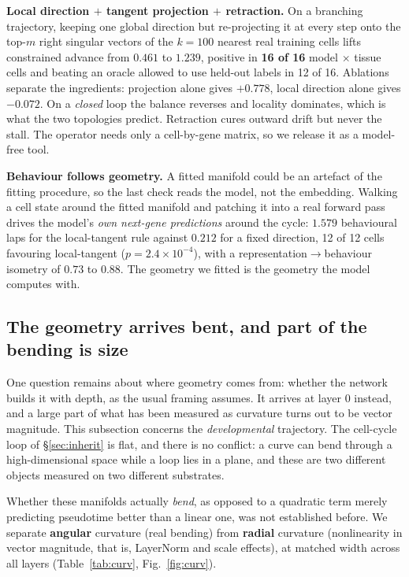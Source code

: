 \documentclass[11pt]{article}
\begin{document}
\textbf{Local direction $+$ tangent projection $+$ retraction.} On a branching trajectory, keeping one
global direction but re-projecting it at every step onto the top-$m$ right singular vectors of the
$k=100$ nearest real training cells lifts constrained advance from $0.461$ to $\mathbf{1.239}$,
positive in \textbf{16 of 16} model $\times$ tissue cells and beating an oracle allowed to use held-out
labels in 12 of 16. Ablations separate the ingredients: projection alone gives $+0.778$, local
direction alone gives $-0.072$. On a \emph{closed} loop the balance reverses and locality dominates,
which is what the two topologies predict. Retraction cures outward drift but never the stall. The
operator needs only a cell-by-gene matrix, so we release it as a model-free tool.

\textbf{Behaviour follows geometry.} A fitted manifold could be an artefact of the fitting procedure,
so the last check reads the model, not the embedding. Walking a cell state around the fitted
manifold and patching it into a real forward pass drives the model's \emph{own next-gene predictions}
around the cycle: $1.579$ behavioural laps for the local-tangent rule against $0.212$ for a fixed
direction, 12 of 12 cells favouring local-tangent ($p=2.4\times10^{-4}$), with a
representation$\to$behaviour isometry of $0.73$ to $0.88$. The geometry we fitted is the geometry the
model computes with.

\subsection{The geometry arrives bent, and part of the bending is size}\label{sec:curv}
One question remains about where geometry comes from: whether the network builds it with depth, as the
usual framing assumes. It arrives at layer 0 instead, and a large part of what has been measured as
curvature turns out to be vector magnitude. This subsection concerns the \emph{developmental}
trajectory. The cell-cycle loop of \S\ref{sec:inherit} is flat, and there is no conflict: a curve can
bend through a high-dimensional space while a loop lies in a plane, and these are two different
objects measured on two different substrates.

Whether these manifolds actually \emph{bend}, as opposed to a quadratic term merely predicting
pseudotime better than a linear one, was not established before. We separate \textbf{angular} curvature
(real bending) from \textbf{radial} curvature (nonlinearity in vector magnitude, that is, LayerNorm and
scale effects), at matched width across all layers (Table~\ref{tab:curv}, Fig.~\ref{fig:curv}).
\end{document}
